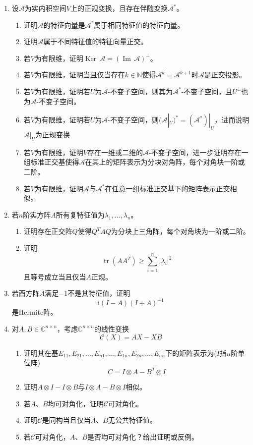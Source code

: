 \documentclass[a4paper,UTF8,fontset=windows,AutoFakeBold]{ctexart}
\DeclareMathOperator{\tr}{tr}
\DeclareMathOperator{\im}{Im\,}
\DeclareMathOperator{\Ker}{Ker\,}
\newcommand*{\ir}{\mathrm{i}}
\newcommand*{\ma}{\mathcal{A}}
\newcommand*{\mc}{\mathcal{C}}
\begin{document}
\begin{enumerate}
    \item 设$\ma$为实内积空间$V$上的正规变换，且存在伴随变换$\ma^*$。
    \begin{enumerate}
        \item 证明$\ma$的特征向量是$\ma^*$属于相同特征值的特征向量。
        \item 证明$\ma$属于不同特征值的特征向量正交。
        \item 若$V$为有限维，证明$\Ker\ma=(\im\ma)^\bot$。
        \item 若$V$为有限维，证明当且仅当存在$k\in\mathbb{N}$使得$\ma^k=\ma^{k+1}$时$\ma$是正交投影。
        \item 若$V$为有限维，证明若$U$为$\ma$-不变子空间，则其为$\ma^*$-不变子空间，且$U^\bot$也为$\ma$-不变子空间。
        \item 若$V$为有限维，证明若$U$为$\ma$-不变子空间，则$(\ma|_U)^*=(\ma^*)|_U$，进而说明$\ma|_U$为正规变换
        \item 若$V$为有限维，证明$V$存在一维或二维的$\ma$-不变子空间，进一步证明存在一组标准正交基使得$\ma$在其上的矩阵表示为分块对角阵，每个对角块一阶或二阶。
        \item 若$V$为有限维，证明$\ma$与$\ma^*$在任意一组标准正交基下的矩阵表示正交相似。
    \end{enumerate}

    \item 若$n$阶实方阵$A$所有复特征值为$\lambda_1,\dots,\lambda_n$。
    \begin{enumerate}
        \item 证明存在正交阵$Q$使得$Q^TAQ$为分块上三角阵，每个对角块为一阶或二阶。
        \item 证明
        $$\tr(AA^T)\ge\sum_{i=1}^n|\lambda_i|^2$$
        且等号成立当且仅当$A$正规。
    \end{enumerate}

    \item 若酉方阵$A$满足$-1$不是其特征值，证明
    $$\ir(I-A)(I+A)^{-1}$$
    是Hermite阵。

    \item 对$A,B\in\mathbb{C}^{n\times n}$，考虑$\mathbb{C}^{n\times n}$的线性变换
    $$\mc(X)=AX-XB$$
    \begin{enumerate}
        \item 证明其在基$E_{11},E_{21},\dots,E_{n1},\dots,E_{1n},E_{2n},\dots,E_{nn}$下的矩阵表示为($I$指$n$阶单位阵)
        $$C=I\otimes A-B^T\otimes I$$
        \item 证明$A\otimes I-I\otimes B$与$I\otimes A-B\otimes I$相似。
        \item 若$A$、$B$均可对角化，证明$\mc$可对角化。
        \item 证明$\mc$是同构当且仅当$A$、$B$无公共特征值。
        \item 若$\mc$可对角化，$A$、$B$是否均可对角化？给出证明或反例。
    \end{enumerate}


\end{enumerate}
\end{document}
